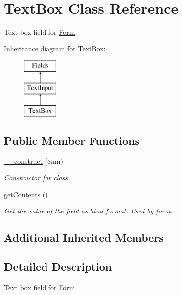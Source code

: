 \hypertarget{class_text_box}{\section{Text\-Box Class Reference}
\label{class_text_box}
}


Text box field for \hyperlink{class_form}{Form}.  


Inheritance diagram for Text\-Box\-:\begin{figure}[H]
\begin{center}
\leavevmode
\includegraphics[height=3.000000cm]{class_text_box}
\end{center}
\end{figure}
\subsection*{Public Member Functions}
\begin{DoxyCompactItemize}
\item 
\hyperlink{class_text_box_ac610fc08cbb0781b26136636de129bc0}{\-\_\-\-\_\-construct} (\$nm)
\begin{DoxyCompactList}\small\item\em Constructor for class. \end{DoxyCompactList}\item 
\hypertarget{class_text_box_a14814e04b348120748912692645f3a75}{\hyperlink{class_text_box_a14814e04b348120748912692645f3a75}{get\-Contents} ()}\label{class_text_box_a14814e04b348120748912692645f3a75}

\begin{DoxyCompactList}\small\item\em Get the value of the field as html format. Used by form. \end{DoxyCompactList}\end{DoxyCompactItemize}
\subsection*{Additional Inherited Members}


\subsection{Detailed Description}
Text box field for \hyperlink{class_form}{Form}. 

